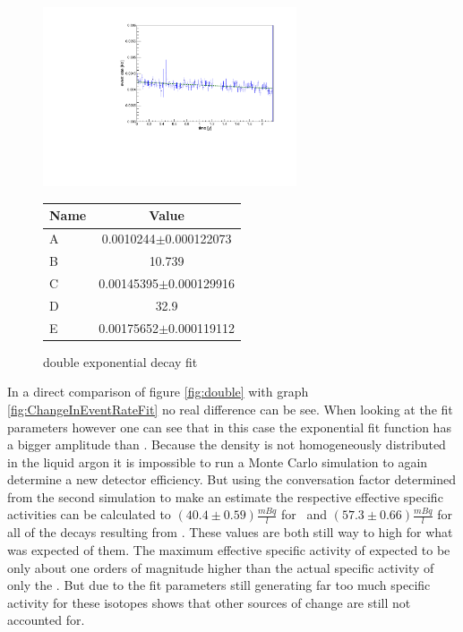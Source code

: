 \documentclass[encoding=utf8,british]{tumphthesis}
\begin{document}
\begin{figure}[t!]
	\centering
	\begin{minipage}{.5\textwidth}
	\centering
	\ifmakefigures%
	\includegraphics[width=75mm]{./Bilder/doppelt.pdf}
	\fi%
	\caption{double exponential decay fit}
	\label{fig:double}
	\end{minipage}\hfill%
	\begin{minipage}{.5\textwidth}
    \centering
    \begin{tabular}{|l|c|}
        \hline
        Name  & Value \\
        \hline
        A     & 0.0010244$\pm$0.000122073 \\
        \hline
        B    & 10.739 \\
        \hline
        C   & 0.00145395$\pm$0.000129916 \\
        \hline
        D  & 32.9 \\
        \hline
        E & 0.00175652$\pm$0.000119112 \\
        \hline
    \end{tabular}
    \label{tab:doubleFitpara}
	\end{minipage}
\end{figure}


In a direct comparison of figure \ref{fig:double} with graph \ref{fig:ChangeInEventRateFit} no real difference can be see.
When looking at the fit parameters however one can see that in this case the  exponential fit function has a bigger amplitude than \Kr.
Because the  density is not homogeneously distributed in the liquid argon it is impossible to run a Monte Carlo simulation to again determine a new detector efficiency.
But using the conversation factor determined from the second simulation to make an estimate the respective effective specific activities can be calculated to $(40.4\pm0.59)\frac{\unit{mBq}}{\unit{l}}$ for \Kr\ and $(57.3\pm0.66)\frac{\unit{mBq}}{\unit{l}}$ for all of the decays resulting from .
These values are both still way to high for what was expected of them.
The maximum effective specific activity of  expected to be  only about one orders of magnitude higher than the actual specific activity of only the .
But due to the fit parameters still generating far too much specific activity for these isotopes shows that other sources of change are still not accounted for.
\\
\end{document}
